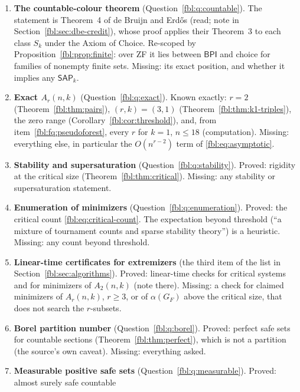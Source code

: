 \documentclass[11pt]{article}
\theoremstyle{definition}
\theoremstyle{remark}
\newcommand{\BPI}{\mathsf{BPI}}
\newcommand{\SAP}{\mathsf{SAP}}
\begin{document}
\begin{enumerate}[leftmargin=*,label=\textbf{\arabic*.},ref=\arabic*]
 implies $\SAP_{k+1}$ or $\BPI$, and their places in the Howard--Rubin
 catalogue.
\item\label{fbl:fq:countable} \textbf{The countable-colour theorem}
 (Question~\ref{fbl:q:countable}). The statement is Theorem~4 of de Bruijn
 and Erd\H{o}s (read; note in Section~\ref{fbl:sec:dbe-credit}), whose proof
 applies their Theorem~3 to each class $S_k$ under the Axiom of Choice.
 Re-scoped by Proposition~\ref{fbl:prop:finite}: over ZF it lies between
 $\BPI$ and choice for families of nonempty finite sets. Missing: its exact
 position, and whether it implies any $\SAP_k$.
\item\label{fbl:fq:exact} \textbf{Exact $A_r(n,k)$}
 (Question~\ref{fbl:q:exact}). Known exactly: $r=2$
 (Theorem~\ref{fbl:thm:pairs}), $(r,k)=(3,1)$
 (Theorem~\ref{fbl:thm:k1-triples}), the zero range
 (Corollary~\ref{fbl:cor:threshold}), and, from item~\ref{fbl:fq:pseudoforest},
 every $r$ for $k=1$, $n\le18$ (computation). Missing: everything else, in
 particular the $O(n^{r-2})$ term of \eqref{fbl:eq:asymptotic}.
\item\label{fbl:fq:stability} \textbf{Stability and supersaturation}
 (Question~\ref{fbl:q:stability}). Proved: rigidity at the critical size
 (Theorem~\ref{fbl:thm:critical}). Missing: any stability or
 supersaturation statement.
\item\label{fbl:fq:enumeration} \textbf{Enumeration of minimizers}
 (Question~\ref{fbl:q:enumeration}). Proved: the critical count
 \eqref{fbl:eq:critical-count}. The expectation beyond threshold (``a
 mixture of tournament counts and sparse stability theory'') is a
 heuristic. Missing: any count beyond threshold.
\item\label{fbl:fq:certificate} \textbf{Linear-time certificates for
 extremizers} (the third item of the list in
 Section~\ref{fbl:sec:algorithms}). Proved: linear-time checks for critical
 systems and for minimizers of $A_2(n,k)$ (note there). Missing: a check
 for claimed minimizers of $A_r(n,k)$, $r\ge3$, or of $\alpha(G_F)$ above
 the critical size, that does not search the $r$-subsets.
\item\label{fbl:fq:borel} \textbf{Borel partition number}
 (Question~\ref{fbl:q:borel}). Proved: perfect safe sets for countable
 sections (Theorem~\ref{fbl:thm:perfect}), which is not a partition (the
 source's own caveat). Missing: everything asked.
\item\label{fbl:fq:measurable} \textbf{Measurable positive safe sets}
 (Question~\ref{fbl:q:measurable}). Proved: almost surely safe countable

\end{enumerate}
\end{document}
